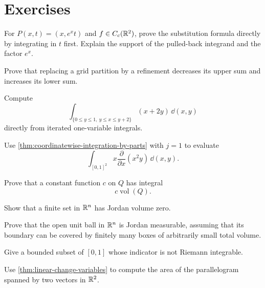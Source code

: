 \section*{Exercises}
\begin{exercise}
For $P(x,t)=(x,e^xt)$ and $f\in C_c(\mathbb{R}^2)$, prove the substitution
formula directly by integrating in $t$ first. Explain the support of
the pulled-back integrand and the factor $e^x$.
\end{exercise}


\begin{exercise}
Prove that replacing a grid partition by a refinement decreases its upper
sum and increases its lower sum.
\end{exercise}

\begin{exercise}
Compute
\[
\int_{\{0\leq y\leq1,\ y\leq x\leq y+2\}}(x+2y)\,\dd(x,y)
\]
directly from iterated one-variable integrals.
\end{exercise}

\begin{exercise}
Use \cref{thm:coordinatewise-integration-by-parts} with \(j=1\) to
evaluate
\[
\int_{[0,1]^2}x\frac{\partial}{\partial x}(x^2y)\,\dd(x,y).
\]
\end{exercise}

\begin{exercise}
Prove that a constant function $c$ on $Q$ has integral
\[
c\operatorname{vol}(Q).
\]
\end{exercise}

\begin{exercise}
Show that a finite set in $\mathbb{R}^n$ has Jordan volume zero.
\end{exercise}

\begin{exercise}
Prove that the open unit ball in $\mathbb{R}^n$ is Jordan measurable, assuming that
its boundary can be covered by finitely many boxes of arbitrarily small total
volume.
\end{exercise}

\begin{exercise}
Give a bounded subset of $[0,1]$ whose indicator is not Riemann integrable.
\end{exercise}

\begin{exercise}
Use \cref{thm:linear-change-variables} to compute the area of the
parallelogram spanned by two vectors in $\mathbb{R}^2$.
\end{exercise}

